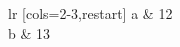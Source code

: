 \documentclass{article}
\begin{document}
\begin{NiceTabular}{lr}
\CodeBefore
  [cols=2-3,restart]
\Body
a & 12 \\
b & 13 \\
\end{NiceTabular}
\end{document}
